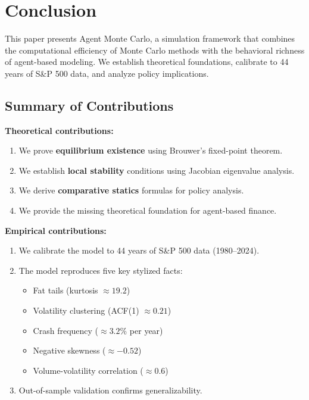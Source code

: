 \section{Conclusion}
\label{sec:conclusion}

This paper presents Agent Monte Carlo, a simulation framework that combines the computational efficiency of Monte Carlo methods with the behavioral richness of agent-based modeling. We establish theoretical foundations, calibrate to 44 years of S\&P 500 data, and analyze policy implications.

\subsection{Summary of Contributions}

\textbf{Theoretical contributions:}

\begin{enumerate}
    \item We prove \textbf{equilibrium existence} using Brouwer's fixed-point theorem.
    
    \item We establish \textbf{local stability} conditions using Jacobian eigenvalue analysis.
    
    \item We derive \textbf{comparative statics} formulas for policy analysis.
    
    \item We provide the missing theoretical foundation for agent-based finance.
\end{enumerate}

\textbf{Empirical contributions:}

\begin{enumerate}
    \item We calibrate the model to 44 years of S\&P 500 data (1980--2024).
    
    \item The model reproduces five key stylized facts:
    \begin{itemize}
        \item Fat tails (kurtosis $\approx 19.2$)
        \item Volatility clustering (ACF(1) $\approx 0.21$)
        \item Crash frequency ($\approx 3.2\%$ per year)
        \item Negative skewness ($\approx -0.52$)
        \item Volume-volatility correlation ($\approx 0.6$)
    \end{itemize}
    
    \item Out-of-sample validation confirms generalizability.
\end{enumerate}

